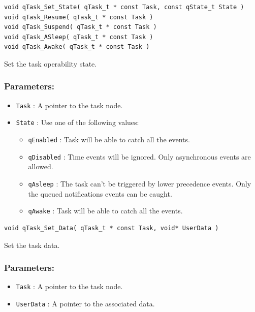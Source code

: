 \documentclass{article}
\begin{document}
\noindent\hrulefill


\begin{lstlisting}[style=CStyle]
void qTask_Set_State( qTask_t * const Task, const qState_t State ) 
void qTask_Resume( qTask_t * const Task ) 
void qTask_Suspend( qTask_t * const Task )
void qTask_ASleep( qTask_t * const Task )
void qTask_Awake( qTask_t * const Task )
\end{lstlisting}   

Set the task operability state.   

\subsubsection*{Parameters:}
\begin{itemize}
    \item \lstinline{Task} : A pointer to the task node.
    \item \lstinline{State} : Use one of the following values:
    \begin{itemize}
        \item \lstinline{qEnabled} : Task will be able to catch all the events.
        \item \lstinline{qDisabled} : Time events will be ignored. Only asynchronous events are allowed.
        \item \lstinline{qAsleep} : The task can't be triggered by lower precedence events. Only the queued notifications events can be caught.
        \item \lstinline{qAwake} : Task will be able to catch all the events.
    \end{itemize}
\end{itemize}

\noindent\hrulefill


\begin{lstlisting}[style=CStyle]
void qTask_Set_Data( qTask_t * const Task, void* UserData )
\end{lstlisting}

Set the task data. 

\subsubsection*{Parameters:}
\begin{itemize}
    \item \lstinline{Task} : A pointer to the task node.
    \item \lstinline{UserData} : A pointer to the associated data.
\end{itemize}
\end{document}
